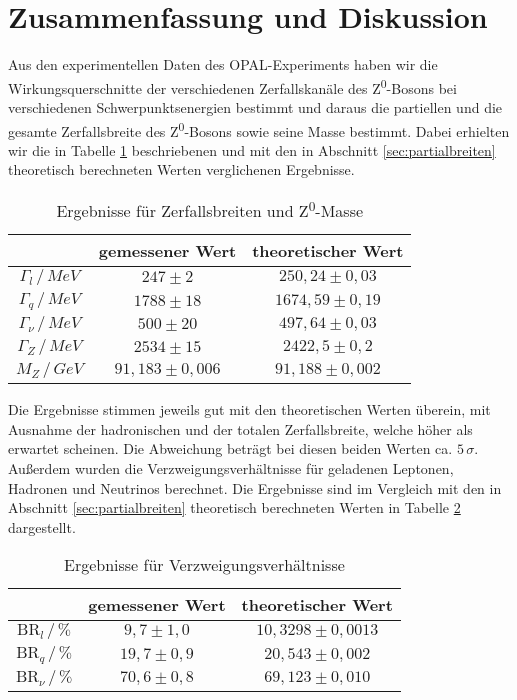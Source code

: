 \section{Zusammenfassung und Diskussion}

Aus den experimentellen Daten des OPAL-Experiments haben wir die Wirkungsquerschnitte der verschiedenen Zerfallskanäle des Z\textsuperscript0-Bosons bei verschiedenen Schwerpunktsenergien bestimmt und daraus die partiellen und die gesamte Zerfallsbreite des Z\textsuperscript0-Bosons sowie seine Masse bestimmt. Dabei erhielten wir die in Tabelle \ref{tab:ergebnisse} beschriebenen und mit den in Abschnitt \ref{sec:partialbreiten} theoretisch berechneten Werten verglichenen Ergebnisse.\\

\begin{table}[bh]
	\centering
	\begin{tabular}{c|cc}
		&gemessener Wert&theoretischer Wert\\\hline
		$\Gamma_l\,/\,\si{MeV}$&$247\pm2$&$250,24\pm0,03$\\
		$\Gamma_q\,/\,\si{MeV}$&$1788\pm18$&$1674,59\pm0,19$\\
		$\Gamma_\nu\,/\,\si{MeV}$&$500\pm20$&$497,64\pm0,03$\\
		$\Gamma_Z\,/\,\si{MeV}$&$2534\pm15$&$2422,5\pm0,2$\\
		$M_Z\,/\,\si{GeV}$&$91,183\pm0,006$&$91,188\pm0,002$
	\end{tabular}
	\caption{Ergebnisse für Zerfallsbreiten und Z\textsuperscript0-Masse}
	\label{tab:ergebnisse}
\end{table}

Die Ergebnisse stimmen jeweils gut mit den theoretischen Werten überein, mit Ausnahme der hadronischen und der totalen Zerfallsbreite, welche höher als erwartet scheinen. Die Abweichung beträgt bei diesen beiden Werten ca. $5\,\sigma$.\\

Außerdem wurden die Verzweigungsverhältnisse für geladenen Leptonen, Hadronen und Neutrinos berechnet. Die Ergebnisse sind im Vergleich mit den in Abschnitt \ref{sec:partialbreiten} theoretisch berechneten Werten in Tabelle \ref{tab:branch} dargestellt.\\

\begin{table}[bh]
	\centering
	\begin{tabular}{c|cc}
		&gemessener Wert&theoretischer Wert\\\hline
		$\mathrm{BR}_l\,/\,\si{\%}$&$9,7\pm1,0$&$10,3298\pm0,0013$\\
		$\mathrm{BR}_q\,/\,\si{\%}$&$19,7\pm0,9$&$20,543\pm0,002$\\
		$\mathrm{BR}_\nu\,/\,\si{\%}$&$70,6\pm0,8$&$69,123\pm0,010$
	\end{tabular}
	\caption{Ergebnisse für Verzweigungsverhältnisse}
	\label{tab:branch}
\end{table}


